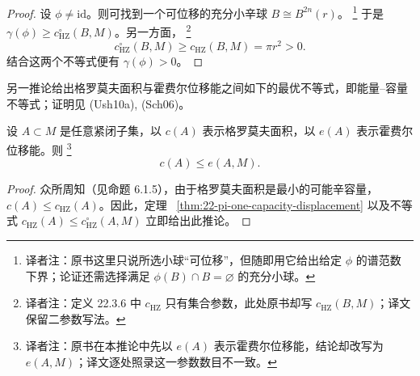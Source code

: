 \begin{proof}
设 $\phi\neq\mathrm{id}$。则可找到一个可位移的充分小辛球 $B\cong B^{2n}(r)$。
\footnote{译者注：原书这里只说所选小球“可位移”，但随即用它给出给定 $\phi$ 的谱范数
下界；论证还需选择满足 $\phi(B)\cap B=\varnothing$ 的充分小球。}
于是 $\gamma(\phi)\geq c_{\mathrm{HZ}}^\circ(B,M)$。另一方面，
\footnote{译者注：定义 22.3.6 中 $c_{\mathrm{HZ}}$ 只有集合参数，此处原书却写
$c_{\mathrm{HZ}}(B,M)$；译文保留二参数写法。}
\[
 c_{\mathrm{HZ}}^\circ(B,M)\geq c_{\mathrm{HZ}}(B,M)=\pi r^2>0.
\]
结合这两个不等式便有 $\gamma(\phi)>0$。
\end{proof}

另一推论给出格罗莫夫面积与霍费尔位移能之间如下的最优不等式，即能量--容量
不等式；证明见 (Ush10a), (Sch06)。

\begin{corollary}
\label{cor:22-sharp-energy-capacity}
设 $A\subset M$ 是任意紧闭子集，以 $c(A)$ 表示格罗莫夫面积，以 $e(A)$ 表示霍费尔
位移能。则
\footnote{译者注：原书在本推论中先以 $e(A)$ 表示霍费尔位移能，结论却改写为
$e(A,M)$；译文逐处照录这一参数数目不一致。}
\[
 c(A)\leq e(A,M).
\]
\end{corollary}

\begin{proof}
众所周知（见命题 6.1.5），由于格罗莫夫面积是最小的可能辛容量，
$c(A)\leq c_{\mathrm{HZ}}(A)$。因此，定理
~\ref{thm:22-pi-one-capacity-displacement} 以及不等式
$c_{\mathrm{HZ}}(A)\leq c_{\mathrm{HZ}}^\circ(A,M)$ 立即给出此推论。
\end{proof}
